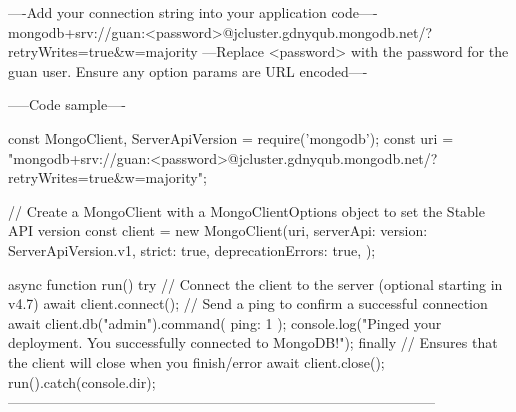 ----Add your connection string into your application code----
mongodb+srv://guan:<password>@jcluster.gdnyqub.mongodb.net/?retryWrites=true&w=majority
---Replace <password> with the password for the guan user. Ensure any option params are URL encoded----

-----Code sample----

const { MongoClient, ServerApiVersion } = require('mongodb');
const uri = "mongodb+srv://guan:<password>@jcluster.gdnyqub.mongodb.net/?retryWrites=true&w=majority";

// Create a MongoClient with a MongoClientOptions object to set the Stable API version
const client = new MongoClient(uri, {
  serverApi: {
    version: ServerApiVersion.v1,
    strict: true,
    deprecationErrors: true,
  }
});

async function run() {
  try {
    // Connect the client to the server	(optional starting in v4.7)
    await client.connect();
    // Send a ping to confirm a successful connection
    await client.db("admin").command({ ping: 1 });
    console.log("Pinged your deployment. You successfully connected to MongoDB!");
  } finally {
    // Ensures that the client will close when you finish/error
    await client.close();
  }
}
run().catch(console.dir);
--------------------------------------------------------------------------------------------